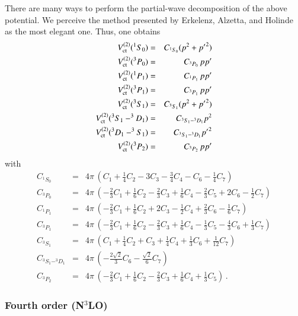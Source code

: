 \documentclass[sort&compress,preprint,3p]{elsarticle}
\def\be{\begin{eqnarray}}
\def\ee{\end{eqnarray}}
\begin{document}
There are many ways to perform the partial-wave decomposition
of the above potential.
We perceive the method presented 
by Erkelenz, Alzetta, and Holinde~\cite{EAH71} as the
most elegant one.
Thus, one obtains
\be
V_{\rm ct}^{(2)}(^1 S_0)          &=&  C_{^1 S_0} ( p^2 + {p'}^2 ) 
\nonumber \\
V_{\rm ct}^{(2)}(^3 P_0)          &=&  C_{^3 P_0} \, p p'
\nonumber \\
V_{\rm ct}^{(2)}(^1 P_1)          &=&  C_{^1 P_1} \, p p' 
\nonumber \\
V_{\rm ct}^{(2)}(^3 P_1)          &=&  C_{^3 P_1} \, p p' 
\nonumber \\
V_{\rm ct}^{(2)}(^3 S_1)          &=&  C_{^3 S_1} ( p^2 + {p'}^2 ) 
\nonumber \\
V_{\rm ct}^{(2)}(^3 S_1- ^3 D_1)  &=&  C_{^3 S_1- ^3 D_1}  p^2 
\nonumber \\
V_{\rm ct}^{(2)}(^3 D_1- ^3 S_1)  &=&  C_{^3 S_1- ^3 D_1}  {p'}^2 
\nonumber \\
V_{\rm ct}^{(2)}(^3 P_2)          &=&  C_{^3 P_2} \, p p' 
\label{eq_ct2_pw}
\ee
with
\be
C_{^1 S_0} 
&=&
4\pi\, \left( C_1 + \frac{1}{4} C_2 - 3 C_3 - \frac{3}{4} C_4 - 
C_6 - \frac{1}{4} C_7 \right)
\nonumber 
\\
C_{^3 P_0} 
&=&
4\pi\, \left( -\frac{2}{3} C_1 + \frac{1}{6} C_2 - \frac{2}{3} C_3 
+ \frac{1}{6} C_4 - \frac{2}{3} C_5
+ 2 C_6 - \frac{1}{2} C_7 \right)
\nonumber 
\\
C_{^1 P_1} 
&=&
4\pi\, \left( -\frac{2}{3} C_1 + \frac{1}{6} C_2 + 2 C_3 
- \frac{1}{2} C_4 
+ \frac{2}{3} C_6 - \frac{1}{6} C_7 \right)
\nonumber 
\\
C_{^3 P_1} 
&=&
4\pi\, \left( -\frac{2}{3} C_1 + \frac{1}{6} C_2 - \frac{2}{3} C_3 
+ \frac{1}{6} C_4 - \frac{1}{3} C_5
- \frac{4}{3} C_6 + \frac{1}{3} C_7 \right)
\nonumber 
\\
C_{^3 S_1} 
&=&
4\pi\, \left( C_1 + \frac{1}{4} C_2 + C_3 + \frac{1}{4} C_4 + 
\frac{1}{3} C_6 + \frac{1}{12} C_7 \right)
\nonumber 
\\
C_{^3 S_1- ^3 D_1} 
&=&
4\pi\, \left( -\frac{2\sqrt{2}}{3} C_6 - \frac{\sqrt{2}}{6} 
C_7 \right)
\nonumber 
\\
C_{^3 P_2} 
&=&
4\pi\, \left( -\frac{2}{3} C_1 + \frac{1}{6} C_2 - \frac{2}{3} C_3 
+ \frac{1}{6} C_4 + \frac{1}{3} C_5 \right) \,.
\label{eq_ct2_pwcoef}
\ee



\subsubsection{Fourth order (N$^3$LO)}
\end{document}
